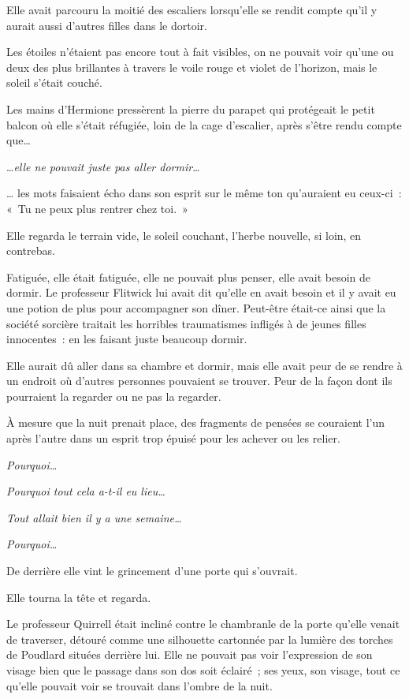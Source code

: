 Elle avait parcouru la moitié des escaliers lorsqu'elle se rendit compte qu'il y aurait aussi d'autres filles dans le dortoir.

\later

Les étoiles n'étaient pas encore tout à fait visibles, on ne pouvait voir qu'une ou deux des plus brillantes à travers le voile rouge et violet de l'horizon, mais le soleil s'était couché.

Les mains d'Hermione pressèrent la pierre du parapet qui protégeait le petit balcon où elle s'était réfugiée, loin de la cage d'escalier, après s'être rendu compte que…

…\emph{elle ne pouvait juste pas aller dormir…}

… les mots faisaient écho dans son esprit sur le même ton qu'auraient eu ceux-ci~: «~Tu ne peux plus rentrer chez toi.~»

Elle regarda le terrain vide, le soleil couchant, l'herbe nouvelle, si loin, en contrebas.

Fatiguée, elle était fatiguée, elle ne pouvait plus penser, elle avait besoin de dormir. Le professeur Flitwick lui avait dit qu'elle en avait besoin et il y avait eu une potion de plus pour accompagner son dîner. Peut-être était-ce ainsi que la société sorcière traitait les horribles traumatismes infligés à de jeunes filles innocentes~: en les faisant juste beaucoup dormir.

Elle aurait dû aller dans sa chambre et dormir, mais elle avait peur de se rendre à un endroit où d'autres personnes pouvaient se trouver. Peur de la façon dont ils pourraient la regarder ou ne pas la regarder.

À mesure que la nuit prenait place, des fragments de pensées se couraient l'un après l'autre dans un esprit trop épuisé pour les achever ou les relier.

\emph{Pourquoi…}

\emph{Pourquoi tout cela a-t-il eu lieu…}

\emph{Tout allait bien il y a une semaine…}

\emph{Pourquoi…}

De derrière elle vint le grincement d'une porte qui s'ouvrait.

Elle tourna la tête et regarda.

Le professeur Quirrell était incliné contre le chambranle de la porte qu'elle venait de traverser, détouré comme une silhouette cartonnée par la lumière des torches de Poudlard situées derrière lui. Elle ne pouvait pas voir l'expression de son visage bien que le passage dans son dos soit éclairé~; ses yeux, son visage, tout ce qu'elle pouvait voir se trouvait dans l'ombre de la nuit.

